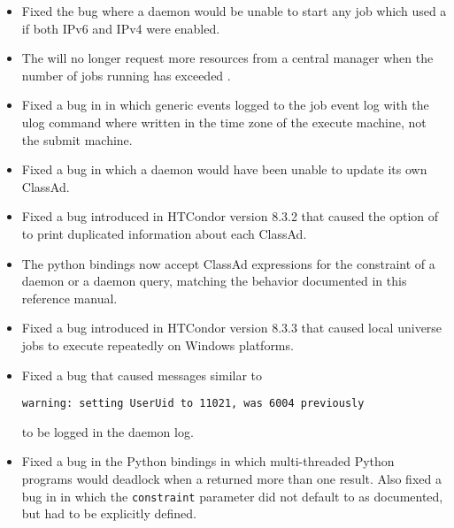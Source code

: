 \begin{itemize}

\item Fixed the bug where a  daemon would be unable to start
any job which used a  if both IPv6 and IPv4 were enabled.

\item The  will no longer request more resources from
a central manager when the number of jobs running has exceeded
.

\item Fixed a bug in  in which generic events logged
to the job event log with the ulog command where written in the time zone
of the execute machine, not the submit machine.

\item Fixed a bug in which a  daemon would have been unable 
to update its own ClassAd.

\item Fixed a bug introduced in HTCondor version 8.3.2 that caused the 
 option of  to print duplicated information 
about each ClassAd.

\item The python bindings now accept ClassAd expressions for the constraint
of a  daemon or a  daemon query, 
matching the behavior documented in this reference manual.

\item Fixed a bug introduced in HTCondor version 8.3.3 that caused 
local universe jobs to execute repeatedly on Windows platforms.

\item Fixed a bug that caused messages similar to
\begin{verbatim}
warning: setting UserUid to 11021, was 6004 previously
\end{verbatim}
to be logged in the  daemon log. 

\item Fixed a bug in the Python bindings in which multi-threaded Python
programs would deadlock when a  returned more than
one result.
Also fixed a bug in  in which
the \texttt{constraint} parameter did not default to  as documented,
but had to be explicitly defined.

\end{itemize}

